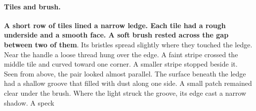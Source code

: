 \documentclass[11pt]{article}
\begin{document}
\paragraph{Tiles and brush.} \textbf{A short row of tiles lined a narrow ledge. Each tile had a rough underside and a smooth face. A soft brush rested across the gap between two of them}. Its bristles spread slightly where they touched the ledge. Near the handle a loose thread hung over the edge. A faint stripe crossed the middle tile and curved toward one corner. A smaller stripe stopped beside it. Seen from above, the pair looked almost parallel. The surface beneath the ledge had a shallow groove that filled with dust along one side. A small patch remained clear under the brush. Where the light struck the groove, its edge cast a narrow shadow. A speck
\end{document}
